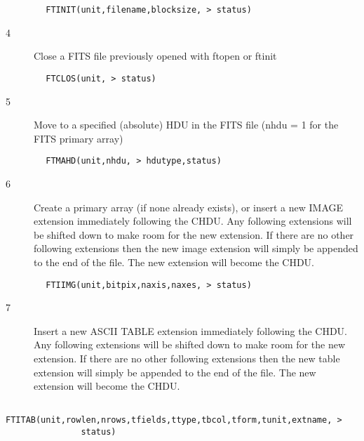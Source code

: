 \documentclass[11pt]{book}
\begin{document}
\begin{verbatim}
        FTINIT(unit,filename,blocksize, > status)
\end{verbatim}

\begin{description}
\item[4 ]Close a FITS file previously opened with ftopen or ftinit
\end{description}

\begin{verbatim}
        FTCLOS(unit, > status)
\end{verbatim}

\begin{description}
\item[5 ] Move to a specified (absolute) HDU in the FITS file (nhdu = 1 for the
   FITS primary array)
\end{description}

\begin{verbatim}
        FTMAHD(unit,nhdu, > hdutype,status)
\end{verbatim}

\begin{description}
\item[6 ] Create a primary array (if none already exists), or insert a
    new IMAGE extension immediately following the CHDU.
    Any following extensions will be shifted down to make room for
    the new extension.  If there are no other following extensions
    then the new image extension will simply be appended to the
   end of the file.  The new extension will become the CHDU.
\end{description}

\begin{verbatim}
        FTIIMG(unit,bitpix,naxis,naxes, > status)
\end{verbatim}

\begin{description}
\item[7 ] Insert a new ASCII TABLE extension immediately following the CHDU.
    Any following extensions will be shifted down to make room for
    the new extension.  If there are no other following extensions
    then the new table extension will simply be appended to the
   end of the file.  The new extension will become the CHDU.
\end{description}

\begin{verbatim}
        FTITAB(unit,rowlen,nrows,tfields,ttype,tbcol,tform,tunit,extname, >
               status)
\end{verbatim}
\end{document}
